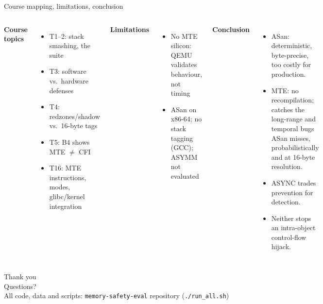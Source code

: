 \documentclass[aspectratio=169,11pt]{beamer}
\begin{document}
\begin{frame}{Course mapping, limitations, conclusion}
\small
\begin{columns}[T]
\textbf{Course topics}
\begin{itemize}\itemsep2pt
\item T1--2: stack smashing, the suite
\item T3: software vs.\ hardware defenses
\item T4: redzones/shadow vs.\ 16-byte tags
\item T5: B4 shows MTE $\neq$ CFI
\item T16: MTE instructions, modes, glibc/kernel integration
\end{itemize}
\textbf{Limitations}
\begin{itemize}\itemsep2pt
\item No MTE silicon: QEMU validates behaviour, not timing
\item ASan on x86-64; no stack tagging (GCC); ASYMM not evaluated
\end{itemize}
\textbf{Conclusion}
\begin{itemize}\itemsep4pt
\item ASan: deterministic, byte-precise, too costly for production.
\item MTE: no recompilation; catches the long-range and temporal bugs ASan misses, probabilistically and at 16-byte resolution.
\item ASYNC trades prevention for detection.
\item Neither stops an intra-object control-flow hijack.
\end{itemize}
\end{columns}
\end{frame}

\begin{frame}
\centering\Huge Thank you\\[10pt]
\normalsize Questions?\\[16pt]
\small\color{ink2} All code, data and scripts: \texttt{memory-safety-eval} repository (\texttt{./run\_all.sh})
\end{frame}
\end{document}
